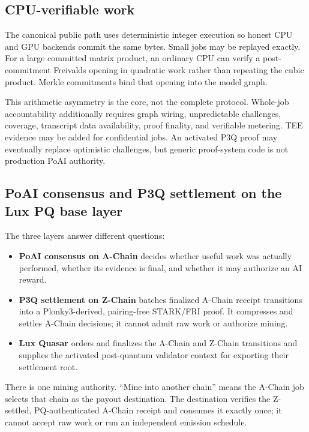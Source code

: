 \subsection{CPU-verifiable work}

The canonical public path uses deterministic integer execution so honest CPU and
GPU backends commit the same bytes. Small jobs may be replayed exactly. For a
large committed matrix product, an ordinary CPU can verify a post-commitment
Freivalds opening in quadratic work rather than repeating the cubic product.
Merkle commitments bind that opening into the model graph.

This arithmetic asymmetry is the core, not the complete protocol. Whole-job
accountability additionally requires graph wiring, unpredictable challenges,
coverage, transcript data availability, proof finality, and verifiable metering.
TEE evidence may be added for confidential jobs. An activated P3Q proof may
eventually replace optimistic challenges, but generic proof-system code is not
production PoAI authority.

\subsection{PoAI consensus and P3Q settlement on the Lux PQ base layer}

The three layers answer different questions:

\begin{itemize}[leftmargin=1.2em]
  \item \textbf{PoAI consensus on A-Chain} decides whether useful work was
        actually performed, whether its evidence is final, and whether it may
        authorize an AI reward.
  \item \textbf{P3Q settlement on Z-Chain} batches finalized A-Chain receipt
        transitions into a Plonky3-derived, pairing-free STARK/FRI proof. It
        compresses and settles A-Chain decisions; it cannot admit raw work or
        authorize mining.
  \item \textbf{Lux Quasar} orders and finalizes the A-Chain and Z-Chain
        transitions and supplies the activated post-quantum validator context
        for exporting their settlement root.
\end{itemize}

There is one mining authority. ``Mine into another chain'' means the A-Chain job
selects that chain as the payout destination. The destination verifies the
Z-settled, PQ-authenticated A-Chain receipt and consumes it exactly once; it
cannot accept raw work or run an independent emission schedule.

